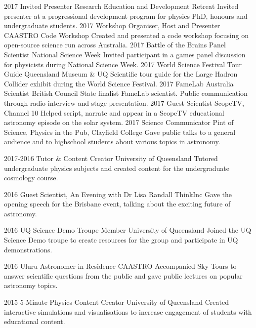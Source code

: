 \documentclass[]{friggeri-cv} %
\begin{document}
\begin{entrylist}
\entry
    {2017}
    {Invited Presenter}
    {Research Education and Development Retreat}
    {Invited presenter at a progressional development program for physics PhD, honours and undergraduate students.}
\entry
    {2017}
    {Workshop Organiser, Host and Presenter}
    {CAASTRO Code Workshop}
    {Created and presented a code workshop focusing on open-source science run across Australia.}
\entry
    {2017}
    {Battle of the Brains Panel Scientist}
    {National Science Week}
    {Invited participant in a games panel discussion for physicists during National Science Week.}
\entry
    {2017}
    {World Science Festival Tour Guide}
    {Queensland Museum \& UQ}
    {Scientific tour guide for the Large Hadron Collider exhibit during the World Science Festival.}
\entry
    {2017}
    {FameLab Australia Scientist}
    {British Council}
    {State finalist FameLab scientist. Public communication through radio interview and stage presentation.}
\entry
    {2017}
    {Guest Scientist}
    {ScopeTV, Channel 10}
    {Helped script, narrate and appear in a ScopeTV educational astronomy episode on the solar system.}
\entry
    {2017}
    {Science Communicator}
    {Pint of Science, Physics in the Pub, Clayfield College}
    {Gave public talks to a general audience and to highschool students about various topics in astronomy.}
\end{entrylist}
\begin{entrylist}
\entry
    {2017-2016}
    {Tutor \& Content Creator}
    {University of Queensland}
    {Tutored undergraduate physics subjects and created content for the undergraduate cosmology course.}
\end{entrylist}
\begin{entrylist}
\entry
    {2016}
    {Guest Scientist, An Evening with Dr Lisa Randall}
    {ThinkInc}
    {Gave the opening speech for the Brisbane event, talking about the exciting future of astronomy.}
\end{entrylist}
\begin{entrylist}
\entry
    {2016}
    {UQ Science Demo Troupe Member}
    {University of Queensland}
    {Joined the UQ Science Demo troupe to create resources for the group and participate in UQ demonstrations.}
\end{entrylist}
\begin{entrylist}
\entry
    {2016}
    {Uluru Astronomer in Residence}
    {CAASTRO}
    {Accompanied Sky Tours to answer scientific questions from the public and gave public lectures on popular astronomy topics.}
\end{entrylist}
\begin{entrylist}
\entry
    {2015}
    {5-Minute Physics Content Creator}
    {University of Queensland}
    {Created interactive simulations and visualisations to increase engagement of students with educational content.}
\end{entrylist}
\end{document}
